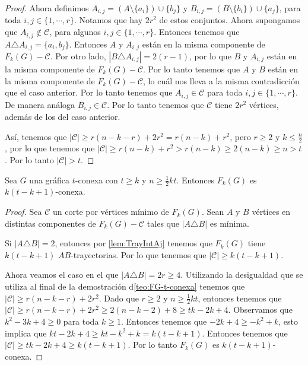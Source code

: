 \begin{proof}
Ahora definimos $A_{i,j} = (A\setminus \{a_i\}) \cup \{b_j\}$ y $B_{i,j} =
(B\setminus \{b_i\}) \cup \{a_j\}$, para toda $ i, j \in \{1, \cdots, r\}$.
Notamos que hay $2r^2$ de estos conjuntos. Ahora supongamos que $A_{i,j} \notin
\mathcal{C}$, para algunos $ i, j \in \{1, \cdots, r\}$. Entonces tenemos que $A
\triangle A_{i,j} = \{a_i, b_j\}$. Entonces $A$ y $A_{i,j}$ est\'an en la misma
componente de $F_k(G)- \mathcal{C}$. Por otro lado, $|B \triangle A_{i,j}| = 2
(r-1)$, por lo que $B$ y $A_{i,j}$ est\'an en la misma componente de $F_k(G) -
\mathcal{C}$. Por lo tanto tenemos que $A$ y $B$ est\'an en la misma componente
de $F_k(G)-\mathcal{C}$, lo cu\'al nos lleva a la misma contradicci\'on que el
caso anterior. Por lo tanto tenemos que $A_{i,j} \in \mathcal{C}$ para toda $i,
j \in \{1, \cdots, r\}$. De manera an\'aloga $B_{i,j} \in \mathcal{C}$. Por lo
tanto tenemos que $\mathcal{C}$ tiene $2r^2$ v\'ertices, adem\'as de los del
caso anterior.

As\'i, tenemos que $|\mathcal{C}|\geq r(n-k-r)+2r^2 = r(n-k) + r^2$, pero $r
\geq 2$ y $k \leq \frac{n}{2}$, por lo que tenemos que $|\mathcal{C}| \geq
r(n-k)+r^2 > r(n-k) \geq 2(n-k) \geq n >t$. Por lo tanto $|\mathcal{C}|>t$.
\end{proof} 

\begin{teorema}%
    \label{teo:FG_k(t- k+ 1)-conexa}
        Sea $G$ una gr\'afica $t$-conexa con $t \ge k$ y $n \ge \frac{1}{2} kt$.
        Entonces $F_{k}(G)$ es $k (t- k+ 1)$-conexa.
    \end{teorema}

    \begin{proof}
        Sea $\mathcal{C}$ un corte por v\'ertices m\'inimo de $F_k(G)$. Sean
        $A$ y $B$ v\'ertices en distintas componentes de $F_k(G)- \mathcal{C}$
        tales que $|A \triangle B|$ es m\'inima.

        Si $|A \triangle B| = 2$, entonces por \cref{lem:TrayIntAj} tenemos que
        $F_k(G)$ tiene $k (t- k+ 1)$ $AB$-trayectorias. Por lo que tenemos que
        $|\mathcal{C}| \geq k (t- k+ 1)$.

        Ahora veamos el caso en el que $|A \triangle B| = 2r \ge 4$. Utilizando
        la desigualdad que se utiliza al final de la demostraci\'on
        d\cref{teo:FG-t-conexa} tenemos que $|\mathcal{C}| \ge r(n-k-r)+2r^2$. Dado
        que $r \ge 2$ y $n \ge \frac{1}{2}kt$, entonces tenemos que
        $|\mathcal{C}| \ge r(n-k-r)+2r^2 \ge 2 (n- k -2) + 8 \ge tk - 2k+ 4$.
        Observamos que $k^2 -3k + 4 \ge 0$ para toda $k \ge 1$. Entonces tenemos
        que $-2k+4 \ge -k^2 + k$, esto implica que $kt -2k +4 \ge kt - k^2 + k =
        k (t - k +1)$. Entonces tenemos que $|\mathcal{C}| \ge tk -2k +4 \ge
        k(t-k+1)$. Por lo tanto $F_k(G)$ es $k(t-k+1)$-conexa.
    \end{proof}
